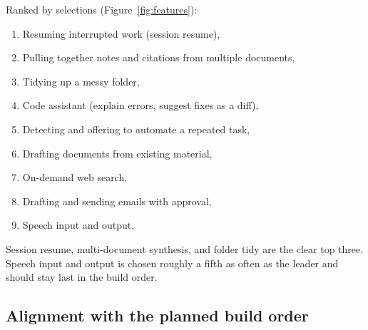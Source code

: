 \documentclass[11pt]{article}
\begin{document}
Ranked by selections (Figure~\ref{fig:features}):
\begin{enumerate}
  \item Resuming interrupted work (session resume), \FeatRankOneCount{}
  \item Pulling together notes and citations from multiple documents, \FeatRankTwoCount{}
  \item Tidying up a messy folder, \FeatRankThreeCount{}
  \item Code assistant (explain errors, suggest fixes as a diff), \FeatRankFourCount{}
  \item Detecting and offering to automate a repeated task, \FeatRankFiveCount{}
  \item Drafting documents from existing material, \FeatRankSixCount{}
  \item On-demand web search, \FeatRankSevenCount{}
  \item Drafting and sending emails with approval, \FeatRankEightCount{}
  \item Speech input and output, \FeatRankNineCount{}
\end{enumerate}

\begin{finding}
Session resume, multi-document synthesis, and folder tidy are the clear top three. Speech input
and output is chosen roughly a fifth as often as the leader and should stay last in the build
order.
\end{finding}

\subsection{Alignment with the planned build order}
\end{document}

